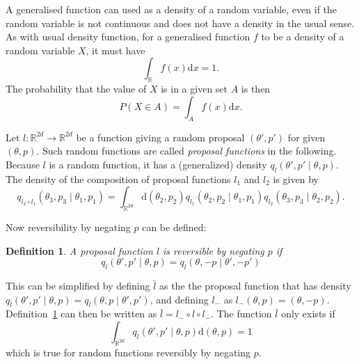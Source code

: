 \documentclass[english,twoside,openright]{HYgraduMLDS}
\newtheorem{definition}{Definition}
\newcommand{\R}{\mathbb{R}}
\newcommand{\dx}{\mathrm{d}}
\begin{document}
A generalised function can used as a density of a random variable, even if the
random variable is not continuous and does not have a density in the usual
sense. As with usual density function, for a generalised function \(f\) to be
a density of a random variable \(X\), it must have
\[
  \int_{\R} f(x)\dx x = 1.
\]
The probability that the value of \(X\) is in a given set \(A\) is then
\[
  P(X\in A) = \int_{A} f(x)\dx x.
\]

Let \(l\colon \R^{2d} \to \R^{2d}\) be a function giving a random
proposal \((\theta', p')\) for given \((\theta, p)\). Such random functions are called
\emph{proposal functions} in the following. Because \(l\) is a random function,
it has a (generalized) density \(q_{l}(\theta', p' \mid \theta, p)\).
The density of the composition of proposal functions \(l_{1}\) and \(l_{2}\)
is given by
\[
  q_{l_{2}\circ l_{1}}(\theta_{3}, p_{3}\mid \theta_{1}, p_{1})
  = \int_{\R^{2d}}\dx(\theta_{2}, p_{2})
  q_{l_{1}}(\theta_{2}, p_{2}\mid \theta_{1}, p_{1})
  q_{l_{2}}(\theta_{3}, p_{3}\mid \theta_{2}, p_{2}).
\]

Now reversibility by negating \(p\) can be defined:
\begin{definition}\label{prop_revers_definition}
  A proposal function \(l\) is reversible by negating \(p\) if
  \[
    q_{l}(\theta', p'\mid \theta, p) = q_{l}(\theta, -p \mid \theta', -p')
  \]
\end{definition}
This can be simplified by defining \(\bar{l}\) as the the proposal
function that has density
\(q_{\bar{l}}(\theta', p'\mid \theta, p) = q_{l}(\theta, p\mid \theta', p')\),
and defining \(l_{-}\) as \(l_{-}(\theta, p) = (\theta, -p)\).
Definition~\ref{prop_revers_definition} can then be written as
\(\bar{l} = l_{-}\circ l\circ l_{-}\). The function \(\bar{l}\) only exists
if
\[
  \int_{\R^{2d}}q_{l}(\theta', p'\mid \theta, p)\dx(\theta, p) = 1
\]
which is true for random functions reversibly by negating \(p\).
\end{document}
